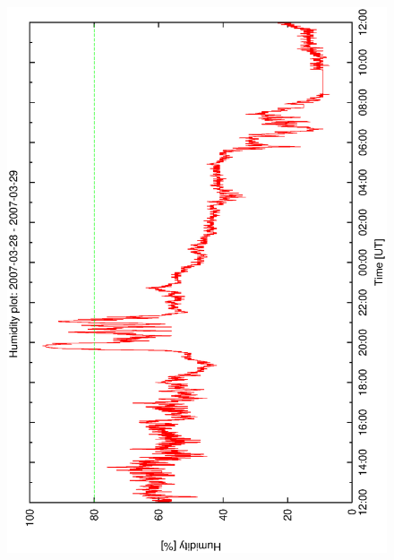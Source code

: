 \begin{figure}[htbp]
\begin{center}
{    \includegraphics[scale=0.25, angle=-90]{figures/ecs/hum_1_2007_03_28.eps}  
    \label{fig:hum_profile_2007_03_28}
  }
\end{center}
\end{figure}
